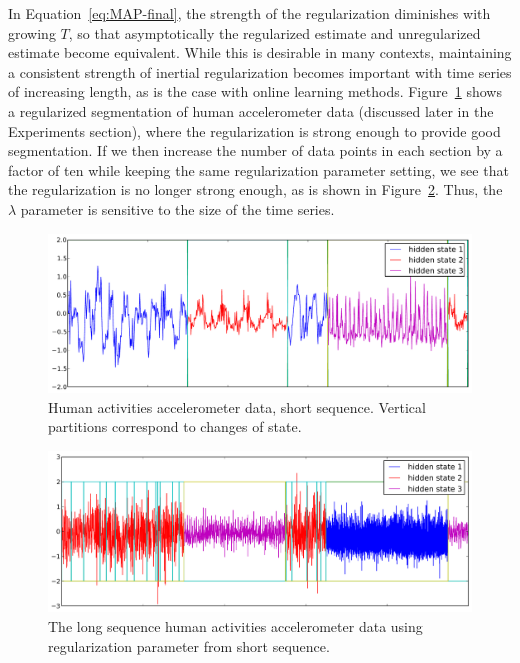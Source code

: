 \documentclass[letterpaper]{article}
\begin{document}
In Equation~\ref{eq:MAP-final}, the strength of the regularization diminishes
with growing $T$, so that asymptotically the regularized estimate and
unregularized estimate become equivalent. While this is desirable in many
contexts, maintaining a consistent strength of inertial regularization becomes
important with time series of increasing length, as is the case with online
learning methods. Figure~\ref{fig:short-real-data} shows a regularized
segmentation of human accelerometer data (discussed later in the Experiments
section), where the regularization is strong enough to provide good segmentation. If we 
then increase the number of data points in each section by a factor of ten while keeping 
the same regularization parameter setting, we see that the regularization is no longer 
strong enough, as is shown in Figure~\ref{fig:long-real-data}. Thus, the $\lambda$ parameter is
sensitive to the size of the time series.

\begin{figure}[htbp]
\setlength{\abovecaptionskip}{0pt}
\setlength{\belowcaptionskip}{0cm}
  \centering
    \includegraphics[width=1.\linewidth]{images/MAP_results_hard_activity_short_3_states.pdf}
  \caption{\small{Human activities accelerometer data, short sequence. Vertical
  partitions correspond to changes of state.}}
  \label{fig:short-real-data}  
\end{figure}
\begin{figure}[htbp]
\setlength{\abovecaptionskip}{0pt}
\setlength{\belowcaptionskip}{0cm}
  \centering
    \includegraphics[width=1.\linewidth]{images/MAP_results_hard_activity_long_3_states.png}    
  \caption{\small{The long sequence human activities accelerometer data using
  regularization parameter from short sequence.}}
  \label{fig:long-real-data}
\end{figure}
\end{document}
